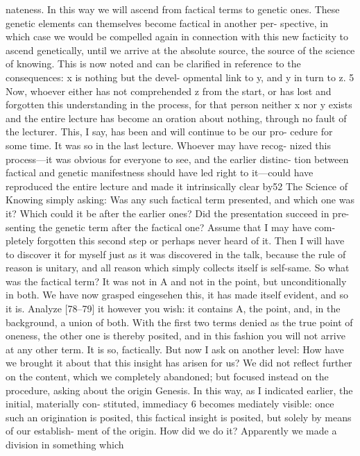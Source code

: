 nateness. In this way we will ascend from factical terms to genetic ones.
These genetic elements can themselves become factical in another per-
spective, in which case we would be compelled again in connection with
this new facticity to ascend genetically, until we arrive at the absolute
source, the source of the science of knowing. This is now noted and can
be clarified in reference to the consequences: x is nothing but the devel-
opmental link to y, and y in turn to z. 5
Now, whoever either has not comprehended z from the start, or has lost
and forgotten this understanding in the process, for that person neither x nor
y exists and the entire lecture has become an oration about nothing, through
no fault of the lecturer. This, I say, has been and will continue to be our pro-
cedure for some time. It was so in the last lecture. Whoever may have recog-
nized this process—it was obvious for everyone to see, and the earlier distinc-
tion between factical and genetic manifestness should have led right to
it—could have reproduced the entire lecture and made it intrinsically clear by52
The Science of Knowing
simply asking: Was any such factical term presented, and which one was it?
Which could it be after the earlier ones? Did the presentation succeed in pre-
senting the genetic term after the factical one? Assume that I may have com-
pletely forgotten this second step or perhaps never heard of it. Then I will
have to discover it for myself just as it was discovered in the talk, because the
rule of reason is unitary, and all reason which simply collects itself is self-same.
So what was the factical term? It was not in A and not in the point, but
unconditionally in both. We have now grasped {eingesehen} this, it has made
itself evident, and so it is. Analyze [78–79] it however you wish: it contains
A, the point, and, in the background, a union of both. With the first two
terms denied as the true point of oneness, the other one is thereby posited,
and in this fashion you will not arrive at any other term. It is so, factically.
But now I ask on another level: How have we brought it about that this
insight has arisen for us? We did not reflect further on the content, which we
completely abandoned; but focused instead on the procedure, asking about the
origin {Genesis}. In this way, as I indicated earlier, the initial, materially con-
stituted, immediacy 6 becomes mediately visible: once such an origination is
posited, this factical insight is posited, but solely by means of our establish-
ment of the origin.
How did we do it? Apparently we made a division in something which
